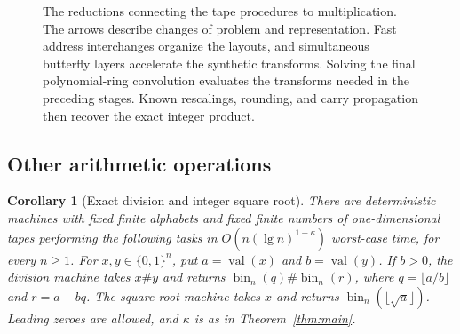 \documentclass[11pt]{article}
\newtheorem{corollary}[theorem]{Corollary}
\theoremstyle{definition}
\begin{document}
\begin{figure}[ht]
\centering
{}
 \caption{The reductions connecting the tape procedures to multiplication.
The arrows describe changes of problem and representation. Fast address
interchanges organize the layouts, and simultaneous butterfly layers
accelerate the synthetic transforms. Solving the final polynomial-ring
convolution evaluates the transforms needed in the preceding stages.
Known rescalings, rounding, and carry propagation then recover the exact
integer product.}
\label{fig:multiplication-flow}
\end{figure}

\subsection{Other arithmetic operations}

\begin{corollary}[Exact division and integer square root]
\label{cor:exact-arithmetic}
There are deterministic machines with fixed finite alphabets and fixed
finite numbers of one-dimensional tapes performing the following tasks
in $O(n(\lg n)^{1-\kappa})$ worst-case time, for every $n\ge1$. For
$x,y\in\{0,1\}^n$, put $a=\operatorname{val}(x)$ and
$b=\operatorname{val}(y)$. If $b>0$, the division machine takes $x\#y$
and returns $\operatorname{bin}_n(q)\#\operatorname{bin}_n(r)$, where
$q=\lfloor a/b\rfloor$ and $r=a-bq$. The square-root machine takes $x$
and returns $\operatorname{bin}_n(\lfloor\sqrt a\rfloor)$.
Leading zeroes are allowed, and $\kappa$ is as in
Theorem~\ref{thm:main}.
\end{corollary}
\end{document}
